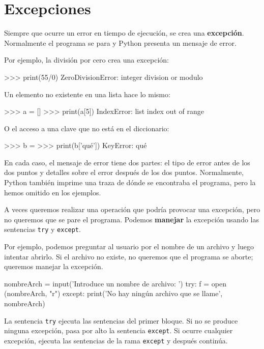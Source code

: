 \section{Excepciones}

  
  

Siempre que ocurre un error en tiempo de ejecución, se crea una \textbf{excepción}.
Normalmente el programa se para y Python presenta un mensaje de error.

Por ejemplo, la división por cero crea una excepción:
\begin{pyconcode}
>>> print(55/0)
ZeroDivisionError: integer division or modulo
\end{pyconcode}

Un elemento no existente en una lista hace lo mismo:
\begin{pyconcode}
>>> a = []
>>> print(a[5])
IndexError: list index out of range
\end{pyconcode}

O el acceso a una clave que no está en el diccionario:
\begin{pyconcode}
>>> b = {}
>>> print(b['qué'])
KeyError: qué
\end{pyconcode}

En cada caso, el mensaje de error tiene dos partes: el tipo de error
antes de los dos puntos y detalles sobre el error después de los dos
puntos. Normalmente, Python también imprime una traza de dónde se
encontraba el programa, pero la hemos omitido en los ejemplos.


A veces queremos realizar una operación que podría provocar una excepción,
pero no queremos que se pare el programa. Podemos \textbf{manejar}
la excepción usando las sentencias \texttt{try} y \texttt{except}.

Por ejemplo, podemos preguntar al usuario por el nombre de un archivo
y luego intentar abrirlo. Si el archivo no existe, no queremos que
el programa se aborte; queremos manejar la excepción.
\begin{pythoncode}
nombreArch = input('Introduce un nombre de archivo: ')
try:
  f = open (nombreArch, "r")
except:
  print('No hay ningún archivo que se llame', nombreArch)
\end{pythoncode}

La sentencia \texttt{try} ejecuta las sentencias del primer bloque.
Si no se produce ninguna excepción, pasa por alto la sentencia \texttt{except}.
Si ocurre cualquier excepción, ejecuta las sentencias de la rama \texttt{except}
y después continúa.


